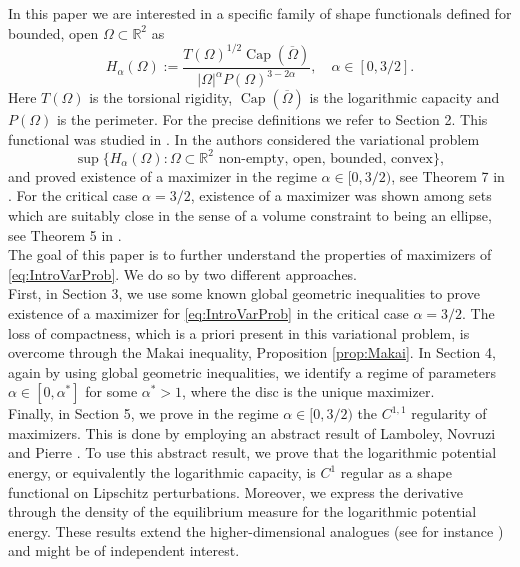 \documentclass[11pt]{article}
\theoremstyle{plain}
\numberwithin{equation}{section}
\theoremstyle{definition}
\DeclareMathOperator{\cp}{Cap}
\def \Om{\Omega}
\def \R {\mathbb{R}}
\begin{document}
    In this paper we are interested in a specific family of shape functionals defined for bounded, open $\Om\subset \R^2$ as
    \[
    H_\alpha(\Om):=\frac{T(\Om)^{1/2}\cp(\overline \Om)}{|\Om|^\alpha P(\Om)^{3-2\alpha}},\quad \alpha \in [0,3/2].
    \]
    Here $T(\Om)$ is the torsional rigidity, $\cp(\overline \Om)$ is the logarithmic capacity and $P(\Om)$ is the perimeter. For the precise definitions we refer to Section 2. This functional was studied in \cite{van2023some}. In \cite{van2023some} the authors considered the variational problem
    \begin{equation}
        \label{eq:IntroVarProb}
        \sup\{H_\alpha(\Om): \Om\subset \R^2 \text{ non-empty, open, bounded, convex}\},
    \end{equation}
    and proved existence of a maximizer in the regime $\alpha \in [0,3/2)$, see Theorem 7 in \cite{van2023some}. For the critical case $\alpha=3/2$, existence of a maximizer was shown among sets which are suitably close in the sense of a volume constraint to being an ellipse, see Theorem 5 in \cite{van2023some}.\\
    The goal of this paper is to further understand the properties of maximizers of \eqref{eq:IntroVarProb}. We do so by two different approaches. \\
    First, in Section 3, we use some known global geometric inequalities to prove existence of a maximizer for \eqref{eq:IntroVarProb} in the critical case $\alpha=3/2$. The loss of compactness, which is a priori present in this variational problem, is overcome through the Makai inequality, Proposition \ref{prop:Makai}. In Section 4, again by using global geometric inequalities, we identify a regime of parameters $\alpha \in [0,\alpha^*]$ for some $\alpha^*>1$, where the disc is the unique maximizer.\\
    Finally, in Section 5, we prove in the regime $\alpha \in [0,3/2)$ the $C^{1,1}$ regularity of maximizers. This is done by employing an abstract result of Lamboley, Novruzi and Pierre \cite{lamboley2012regularity}. To use this abstract result, we prove that the logarithmic potential energy, or equivalently the logarithmic capacity, is $C^1$ regular as a shape functional on Lipschitz perturbations. Moreover, we express the derivative through the density of the equilibrium measure for the logarithmic potential energy. These results extend the higher-dimensional analogues (see for instance \cite{Jerison,crasta2005long}) and might be of independent interest. 
    
\end{document}
